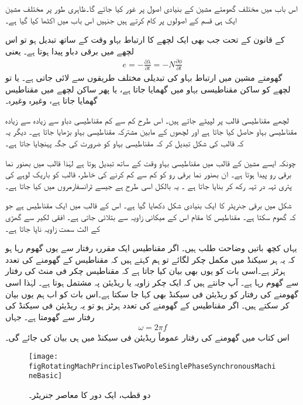اس باب میں مختلف گھومتے مشین کے بنیادی اصول پر غور کیا جائے گا۔ظاہری طور پر مختلف مشین ایک ہی قسم کے اصولوں پر کام کرتے ہیں جنہیں اس باب میں اکٹھا کیا گیا ہے۔

 کے قانون کے تحت جب بھی ایک لچھے کا ارتباط بہاو   وقت کے ساتھ تبدیل ہو تو اس لچھے میں برقی دباو پیدا ہوتا ہے۔ یعنی
\begin{align}
e=-\frac{\partial \lambda}{\partial t}=-N \frac{\partial \phi}{\partial t}
\end{align}
گھومتے مشین میں ارتباط بہاو کی تبدیلی مختلف طریقوں سے لائی جاتی ہے۔ یا تو لچھے کو ساکن مقناطیسی بہاو میں گھمایا جاتا ہے، یا پھر ساکن لچھے میں مقناطیس گھمایا جاتا ہے، وغیرہ وغیرہ۔

لچھے مقناطیسی قالب  پر لپیٹے جاتے ہیں۔ اس طرح کم سے کم مقناطیسی دباو سے زیادہ سے زیادہ مقناطیسی بہاو حاصل کیا جاتا ہے اور لچھوں کے مابین مشترکہ مقناطیسی بہاو بڑھایا جاتا ہے۔ دیگر یہ کہ قالب کی شکل تبدیل کر کہ مقناطیسی بہاو کو ضرورت کی جگہ پہنچایا جاتا ہے۔

چونکہ ایسے مشین کے قالب میں مقناطیسی بہاو وقت کے ساتھ تبدیل ہوتا ہے لہٰذا قالب میں بھنور نما برقی رو پیدا ہوتا ہے۔ ان بھنور نما برقی رو کو کم سے کم کرنے کی خاطر، قالب کو باریک لوہے کی پتری تہہ در تہہ رکھ کر بنایا جاتا ہے ۔ یہ بالکل اسی طرح ہے جیسے ٹرانسفارمروں میں کیا جاتا ہے۔

شکل   میں  برقی جنریٹر کا ایک بنیادی شکل دکھایا گیا ہے۔ اس کے قالب میں ایک مقناطیس ہے جو کہ گھوم سکتا ہے۔ مقناطیس کا مقام اس کے میکانی زاویہ  سے بتلائی جاتی ہے۔ افقی لکیر سے گھڑی کے الٹ سمت زاویہ  ناپا جاتا ہے۔

یہاں کچھ باتیں وضاحت طلب ہیں۔ اگر مقناطیس ایک مقررہ رفتار سے یوں گھوم رہا ہو کہ یہ ہر سیکنڈ میں    مکمل چکر لگائے تو ہم کہتے ہیں کہ مقناطیس کے گھومنے کی تعدد   ہرٹز ہے۔اسی بات کو یوں بھی بیان کیا جاتا ہے کہ مقناطیس  چکر فی منٹ کی رفتار سے گھوم رہا ہے۔ آپ جانتے ہیں کہ ایک چکر  زاویہ یا  ریڈیئن  پہ مشتمل ہوتا ہے۔ لہٰذا اسی گھومنے کی رفتار کو  ریڈیئن فی سیکنڈ بھی کہا جا سکتا ہے۔اس بات کو اب ہم یوں بیان کر سکتے ہیں۔ اگر مقناطیس کے گھومنے کی تعدد  ہرٹز ہو تو یہ  ریڈیئن فی سیکنڈ کی رفتار سے گھومتا ہے۔ جہاں
\begin{align}
\omega =2\pi f
\end{align}
اس کتاب میں گھومنے کی رفتار عموماً ریڈیئن فی سیکنڈ میں ہی بیان کی جائے گی۔
\begin{figure}
\centering
\texttt{[image: figRotatingMachPrinciplesTwoPoleSinglePhaseSynchronousMachineBasic]}
\caption{دو قطب، ایک دور کا معاصر جنریٹر۔}
\label{شکل_گھومتے_مشین_دو_قطب_ایک_دور_معاصر_بنیادی_شکل}
\end{figure}

